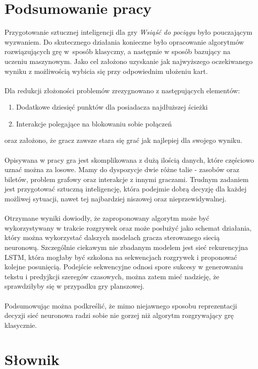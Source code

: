 \documentclass[12pt, oneside]{report}
\begin{document}
	\chapter{Podsumowanie pracy}
	Przygotowanie sztucznej inteligencji dla gry \textit{Wsiąść do pociągu} było pouczającym wyzwaniem. Do skutecznego działania konieczne było opracowanie algorytmów rozwiązujących grę w~sposób klasyczny, a następnie w sposób bazujący na uczeniu maszynowym. Jako cel założono uzyskanie jak najwyższego oczekiwanego wyniku z możliwością wybicia się przy odpowiednim ułożeniu kart. \\ \\ 
	Dla redukcji złożoności problemów zrezygnowano z następujących elementów:
	\begin{enumerate}
		\item Dodatkowe dziesięć punktów dla posiadacza najdłuższej ścieżki
		\item Interakcje polegające na blokowaniu sobie połączeń
	\end{enumerate}
	oraz założono, że gracz zawsze stara się grać jak najlepiej dla swojego wyniku. \\ \\  
	Opisywana w pracy gra jest skomplikowana z dużą ilością danych, które częściowo uznać można za losowe. Mamy do dyspozycje dwie różne talie - zasobów oraz biletów, problem grafowy oraz interakcje z innymi graczami. Trudnym zadaniem jest przygotować sztuczną inteligencję, która podejmie dobrą decyzję dla każdej możliwej sytuacji, nawet tej najbardziej niszowej oraz nieprzewidywalnej. \\ \\ 
	Otrzymane wyniki dowiodły, że zaproponowany algorytm może być wykorzystywany w trakcie rozgrywek oraz może posłużyć jako schemat działania, który można wykorzystać dalszych modelach gracza sterowanego siecią neuronową. Szczególnie ciekawym nie zbadanym modelem jest sieć rekurencyjna LSTM, która mogłaby być szkolona na sekwencjach rozgrywek i proponować kolejne posunięcią. Podejście sekwencyjne odnosi spore sukcesy w generowaniu tekstu i predyjkcji szeregów czasowych, można zatem mieć nadzieję, że sprawdziłyby się w przypadku gry planszowej. \\ \\ 
	Podsumowując można podkreślić, że mimo niejawnego sposobu reprezentacji decyzji sieć neuronowa radzi sobie nie gorzej niż algorytm rozgrywający grę klasycznie. 
	\chapter{Słownik}
	\label{chap:dictionary}
\end{document}
